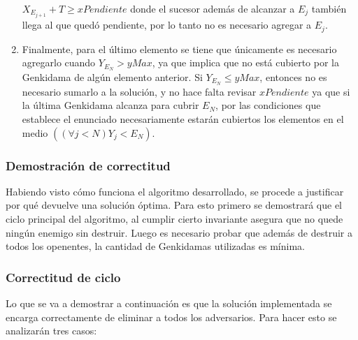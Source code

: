 \begin{enumerate}
{\begin{enumerate}
{\begin{enumerate}
{\begin{enumerate}
{									\label{ej2_imp:caso_cubierto}
									$X_{E_{j+1}} + T \geq xPendiente$ donde el
									sucesor además de alcanzar a $E_j$ también llega
									al que quedó pendiente, por lo tanto no es
									necesario agregar a	$E_j$.
								}
							\end{enumerate}
						}
					\end{enumerate}
				}
				\end{enumerate}
			}
			\item{
				\label{ej2_imp:caso_n}
				Finalmente, para el último elemento se tiene que únicamente
				es necesario agregarlo cuando $Y_{E_N} > yMax$, ya que
				implica que no está cubierto por la Genkidama de algún
				elemento anterior. Si $Y_{E_N} \leq yMax$, entonces no es
				necesario sumarlo a la solución, y no hace falta revisar
				$xPendiente$ ya que si la última Genkidama alcanza para
				cubrir $E_N$, por las condiciones que establece el
				enunciado necesariamente estarán cubiertos los elementos en
				el medio $((\forall j < N) Y_j < E_N)$.
			}
	\end{enumerate}

	\subsubsection{Demostración de correctitud}

	Habiendo visto cómo funciona el algoritmo desarrollado, se procede a
	justificar por qué devuelve una solución óptima. Para esto primero se
	demostrará que el ciclo principal del algoritmo, al cumplir cierto
	invariante asegura que no quede ningún enemigo sin destruir. Luego es
	necesario probar que además de destruir a todos los openentes, la cantidad
	de Genkidamas utilizadas es mínima.

	\subsubsection*{Correctitud de ciclo}

	Lo que se va a demostrar a continuación es que la solución implementada se
	encarga correctamente de eliminar a todos los adversarios. Para hacer esto
	se analizarán tres casos:

